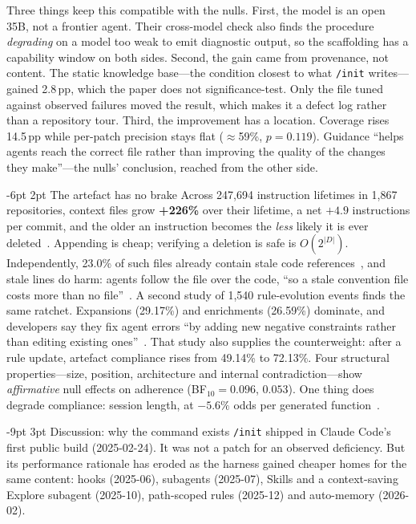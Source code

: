 \documentclass[10pt,twocolumn,a4paper]{article}
\makeatletter
\renewcommand\section{\@startsection{section}{1}{\z@}%
  {-9pt \@plus -2pt \@minus -1pt}{3pt}%
  {\normalfont\large\bfseries\color{acc}}}
\renewcommand\subsection{\@startsection{subsection}{2}{\z@}%
  {-6pt \@plus -1pt \@minus -1pt}{2pt}%
  {\normalfont\normalsize\bfseries}}
\makeatother
\begin{document}
Three things keep this compatible with the nulls. First, the model is an open
35B, not a frontier agent. Their cross-model check also finds the procedure
\emph{degrading} on a model too weak to emit diagnostic output, so the scaffolding
has a capability window on both sides. Second, the gain came from provenance, not
content. The static knowledge base---the condition closest to what \texttt{/init}
writes---gained 2.8\,pp, which the paper does not significance-test. Only the file
tuned against observed failures moved the result, which makes it a defect log
rather than a repository tour. Third, the improvement has a location. Coverage
rises 14.5\,pp while per-patch precision stays flat ($\approx$59\%, $p=0.119$).
Guidance ``helps agents reach the correct file rather than improving the quality
of the changes they make''---the nulls' conclusion, reached from the other side.

\subsection{The artefact has no brake}
Across 247{,}694 instruction lifetimes in 1{,}867 repositories, context files grow
\textbf{+226\%} over their lifetime, a net $+4.9$ instructions per commit, and the
older an instruction becomes the \emph{less} likely it is ever
deleted~\cite{chakrabarti}. Appending is cheap; verifying a deletion is safe is
$O(2^{|D|})$. Independently, 23.0\% of such files already contain stale code
references~\cite{treude}, and stale lines do harm: agents follow the file over the
code, ``so a stale convention file costs more than no file''~\cite{mohammadi}. A
second study of 1{,}540 rule-evolution events finds
the same ratchet. Expansions (29.17\%) and enrichments (26.59\%) dominate, and
developers say they fix agent errors ``by adding new negative constraints rather
than editing existing ones''~\cite{cai}. That study also supplies the
counterweight: after a rule update, artefact compliance rises from 49.14\% to
72.13\%. Four structural properties---size, position,
architecture and internal contradiction---show \emph{affirmative} null effects on
adherence (BF$_{10}=0.096$, $0.053$). One thing does degrade compliance: session
length, at $-5.6\%$ odds per generated function~\cite{mcmillan}.

\section{Discussion: why the command exists}
\texttt{/init} shipped in Claude Code's first public build (2025-02-24). It was
not a patch for an observed deficiency. But its performance rationale has eroded
as the harness gained cheaper homes for the same content: hooks (2025-06),
subagents (2025-07), Skills and a context-saving Explore subagent (2025-10),
path-scoped rules (2025-12) and auto-memory (2026-02).
\end{document}
